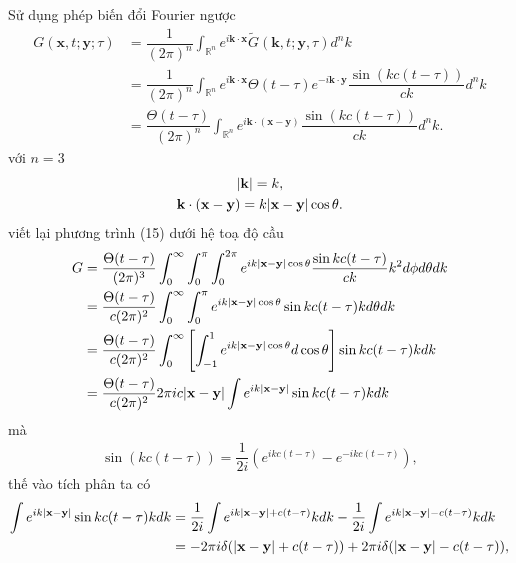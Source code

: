 \documentclass{report}
\newcommand{\f}[2]{\dfrac{#1}{#2}}
\begin{document}
	Sử dụng phép biến đổi Fourier ngược
	\begin{equation}
		\begin{aligned}
			G(\mathbf{x},t;\mathbf{y};\tau) 
			&= \f{1}{(2\pi)^{n}} \int_{\mathbb{R}^{n}} e^{i \mathbf{k} \cdot \mathbf{x}} \tilde{G} (\mathbf{k}, t; \mathbf{y},\tau)  d^{n} k\\
			&= \f{1}{(2\pi)^{n}} \int_{\mathbb{R}^{n}} e^{i \mathbf{k} \cdot \mathbf{x}} \Theta(t - \tau) e^{-i \mathbf{k} \cdot \mathbf{y}} \f{\sin ( k c (t - \tau) )}{c k}  d^{n} k\\
			&= \f{\Theta(t - \tau)}{(2\pi)^{n}} \int_{\mathbb{R}^{n}} e^{i \mathbf{k} \cdot (\mathbf{x} - \mathbf{y})}   \f{\sin ( k c (t - \tau) )}{c k}  d^{n} k.
		\end{aligned}
	\end{equation}	
	với $n = 3$
	\begin{gather}
		\abs{\mathbf{k}} = k,\\
		\mathbf{k} \cdot (\mathbf{x} - \mathbf{y}) = k \abs{\mathbf{x} - \mathbf{y}} \cos \theta.
	\end{gather}	
	viết lại phương trình (15) dưới hệ toạ độ cầu
	\begin{equation}
		\begin{aligned}
			G 
			&= \f{\Theta(t - \tau)}{(2\pi)^{3}} \int_{0}^{\infty} \int_{0}^{\pi} \int_{0}^{2\pi} e^{ i k \abs{\mathbf{x} - \mathbf{y}} \cos \theta} \f{\sin kc(t - \tau)}{ck} k^{2} d\phi d\theta dk\\ 
			&= \f{\Theta(t - \tau)}{c(2\pi)^{2}} \int_{0}^{\infty} \int_{0}^{\pi} e^{ i k \abs{\mathbf{x} - \mathbf{y}} \cos \theta} \sin kc(t - \tau) k d\theta dk\\ 
			&= \f{\Theta(t - \tau)}{c(2\pi)^{2}} \int_{0}^{\infty} \left[ \int_{-1}^{1} e^{ i k \abs{\mathbf{x} - \mathbf{y}} \cos \theta} d \cos\theta \right] \sin kc(t - \tau) k  dk\\ 
			&= \f{\Theta(t - \tau)}{c(2\pi)^{2}} 2 \pi i c \abs{\mathbf{x} - \mathbf{y}} \int e^{ i k \abs{\mathbf{x} - \mathbf{y}}} \sin kc(t - \tau) k  dk
		\end{aligned}
	\end{equation}
	mà
	\begin{gather}
		\sin(kc(t - \tau)) = \f{1}{2i} \left( e^{i k c (t - \tau)} - e^{-ikc (t -\tau)} \right),
	\end{gather}
	thế vào tích phân ta có
	\begin{equation}
		\begin{aligned}
			\int e^{ i k \abs{\mathbf{x} - \mathbf{y}}} \sin kc(t - \tau) k  dk 
			&= \f{1}{2i} \int e^{ik \abs{\mathbf{x - y}} + c(t -\tau)} k dk  - \f{1}{2i} \int e^{ik \abs{\mathbf{x - y}} - c(t - \tau)} k dk\\
			&= -2 \pi i \delta( \abs{\mathbf{x - y}} + c (t - \tau)) + 2 \pi i \delta( \abs{\mathbf{x - y}} - c (t - \tau)),
		\end{aligned}
	\end{equation}
\end{document}
